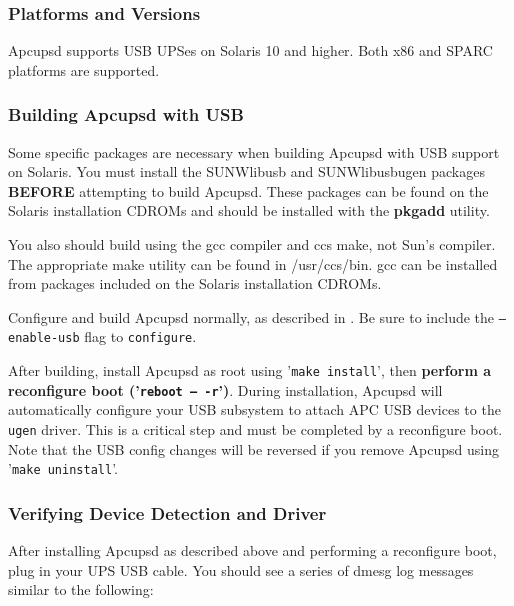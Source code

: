 \subsubsection*{Platforms and Versions}

Apcupsd supports USB UPSes on Solaris 10 and higher. Both x86 and SPARC
platforms are supported.

\subsubsection*{Building Apcupsd with USB}

Some specific packages are necessary when building Apcupsd with USB support
on Solaris. You must install the SUNWlibusb and SUNWlibusbugen packages
{\bf BEFORE} attempting to build Apcupsd. These packages can be found on 
the Solaris installation CDROMs and should be installed with the {\bf pkgadd}
utility.

You also should build using the gcc compiler and ccs make, not Sun's
compiler. The appropriate make utility can be found in /usr/ccs/bin.
gcc can be installed from packages included on the Solaris installation
CDROMs.

Configure and build Apcupsd normally, as described in
. Be
sure to include the \texttt{{---}enable-usb} flag to \texttt{configure}.

After building, install Apcupsd as root using '\texttt{make install}', then
{\bf perform a reconfigure boot ('\texttt{reboot {---} -r}')}. During 
installation, Apcupsd will automatically configure your USB subsystem to 
attach APC USB devices to the \texttt{ugen} driver. This is a critical step
and must be completed by a reconfigure boot. Note that the USB config changes
will be reversed if you remove Apcupsd using '\texttt{make uninstall}'.

\subsubsection*{Verifying Device Detection and Driver}

After installing Apcupsd as described above and performing a reconfigure boot,
plug in your UPS USB cable. You should see a series of dmesg log messages similar
to the following: 

